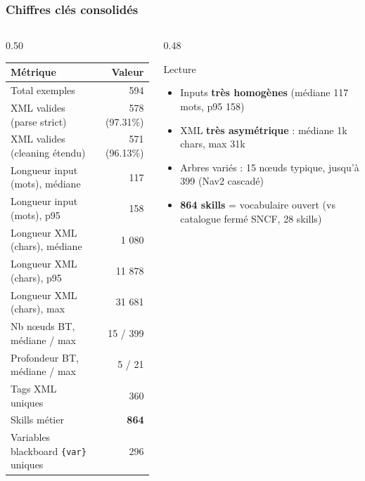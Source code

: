 \documentclass[aspectratio=169]{beamer}
\begin{document}
\begin{frame}
  \frametitle{Chiffres clés consolidés}

  \begin{columns}[T]
    \begin{column}{0.50\textwidth}
      {\scriptsize\begin{tabular}{lr}
        \toprule
        \textbf{Métrique} & \textbf{Valeur} \\
        \midrule
        Total exemples & 594 \\
        XML valides (parse strict) & 578 (97.31\%) \\
        XML valides (cleaning étendu) & 571 (96.13\%) \\
        \midrule
        Longueur input (mots), médiane & 117 \\
        Longueur input (mots), p95 & 158 \\
        \midrule
        Longueur XML (chars), médiane & 1 080 \\
        Longueur XML (chars), p95 & 11 878 \\
        Longueur XML (chars), max & 31 681 \\
        \midrule
        Nb nœuds BT, médiane / max & 15 / 399 \\
        Profondeur BT, médiane / max & 5 / 21 \\
        \midrule
        Tags XML uniques & 360 \\
        Skills métier & \textbf{864} \\
        Variables blackboard \texttt{\{var\}} uniques & 296 \\
        \bottomrule
      \end{tabular}}
    \end{column}
    \begin{column}{0.48\textwidth}
      \begin{exampleblock}{Lecture}
        \small
        \begin{itemize}\itemsep1pt
          \item Inputs \textbf{très homogènes} (médiane 117 mots, p95 158)
          \item XML \textbf{très asymétrique} : médiane 1k chars, max 31k
          \item Arbres variés : 15 nœuds typique, jusqu'à 399 (Nav2 cascadé)
          \item \textbf{864 skills} = vocabulaire ouvert (vs catalogue fermé SNCF, 28 skills)
        \end{itemize}
      \end{exampleblock}
    \end{column}
  \end{columns}
\end{frame}
\end{document}
